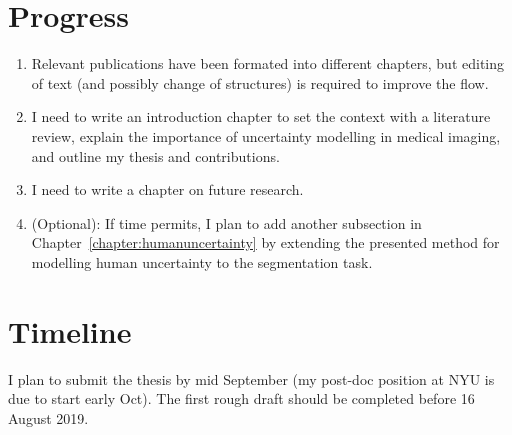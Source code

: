 
\section*{Progress}
\begin{enumerate}
	\item Relevant publications have been formated into different chapters, but editing of text (and possibly change of structures) is required to improve the flow. 
	\item I need to write an introduction chapter to set the context with a literature review, explain the importance of uncertainty modelling in medical imaging, and outline my thesis and contributions. 
	\item I need to write a chapter on future research. 
	\item (Optional): If time permits, I plan to add another subsection in Chapter~\ref{chapter:humanuncertainty} by extending the presented method for modelling human uncertainty to the segmentation task.		
\end{enumerate}

\section*{Timeline}
I plan to submit the thesis by mid September (my post-doc position at NYU is due to start early Oct). The first rough draft should be completed before 16 August 2019. 

